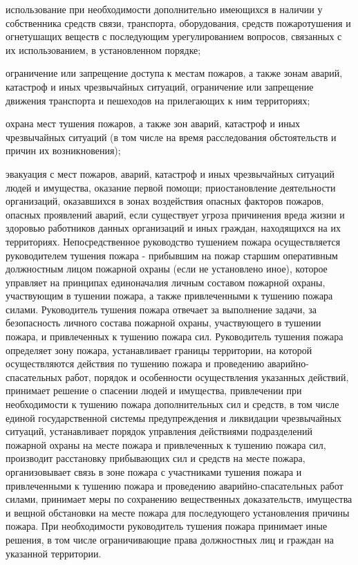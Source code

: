 \documentclass[a4paper, 12pt]{article}
\theoremstyle{definition}
\begin{document}
        использование при необходимости дополнительно имеющихся в наличии у собственника средств связи, транспорта, оборудования, средств пожаротушения и огнетушащих веществ с последующим урегулированием вопросов, связанных с их использованием, в установленном порядке;

        ограничение или запрещение доступа к местам пожаров, а также зонам аварий, катастроф и иных чрезвычайных ситуаций, ограничение или запрещение движения транспорта и пешеходов на прилегающих к ним территориях;

        охрана мест тушения пожаров, а также зон аварий, катастроф и иных чрезвычайных ситуаций (в том числе на время расследования обстоятельств и причин их возникновения);

        эвакуация с мест пожаров, аварий, катастроф и иных чрезвычайных ситуаций людей и имущества, оказание первой помощи;
        приостановление деятельности организаций, оказавшихся в зонах воздействия опасных факторов пожаров, опасных проявлений аварий, если существует угроза причинения вреда жизни и здоровью работников данных организаций и иных граждан, находящихся на их территориях.
        Непосредственное руководство тушением пожара осуществляется руководителем тушения пожара - прибывшим на пожар старшим оперативным должностным лицом пожарной охраны (если не установлено иное), которое управляет на принципах единоначалия личным составом пожарной охраны, участвующим в тушении пожара, а также привлеченными к тушению пожара силами.
        Руководитель тушения пожара отвечает за выполнение задачи, за безопасность личного состава пожарной охраны, участвующего в тушении пожара, и привлеченных к тушению пожара сил.
        Руководитель тушения пожара определяет зону пожара, устанавливает границы территории, на которой осуществляются действия по тушению пожара и проведению аварийно-спасательных работ, порядок и особенности осуществления указанных действий, принимает решение о спасении людей и имущества, привлечении при необходимости к тушению пожара дополнительных сил и средств, в том числе единой государственной системы предупреждения и ликвидации чрезвычайных ситуаций, устанавливает порядок управления действиями подразделений пожарной охраны на месте пожара и привлеченных к тушению пожара сил, производит расстановку прибывающих сил и средств на месте пожара, организовывает связь в зоне пожара с участниками тушения пожара и привлеченными к тушению пожара и проведению аварийно-спасательных работ силами, принимает меры по сохранению вещественных доказательств, имущества и вещной обстановки на месте пожара для последующего установления причины пожара. При необходимости руководитель тушения пожара принимает иные решения, в том числе ограничивающие права должностных лиц и граждан на указанной территории.
\end{document}
